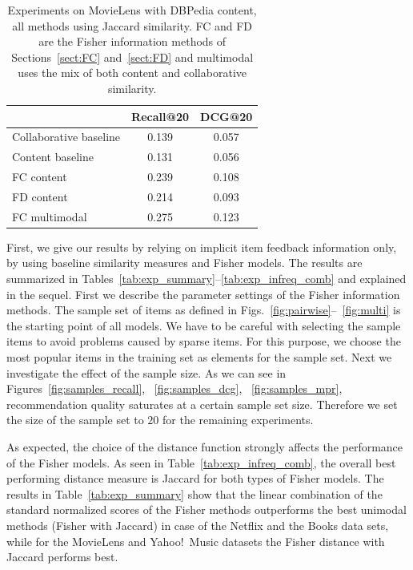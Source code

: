\begin{table} 
\caption[]{Experiments on MovieLens with DBPedia content, all methods using Jaccard similarity.  FC and FD are the Fisher information methods of Sections~\ref{sect:FC} and~\ref{sect:FD} and multimodal uses the mix of both content and collaborative similarity.}
\centering
    \begin{tabular}{lcc}
			& Recall@20 	& DCG@20 \\ \hline
Collaborative baseline	& 0.139		& 0.057 \\
Content baseline      	& 0.131 	& 0.056 \\
FC content 		& 0.239 	& 0.108 \\
FD content		& 0.214 	& 0.093 \\
FC multimodal    	& 0.275 	& 0.123 \\ \hline 
    \end{tabular}
      \label{tab:exp_content}
\end{table}

First, we give our results by relying on implicit item feedback information only, by using baseline similarity measures and Fisher models.  The results are summarized in Tables~\ref{tab:exp_summary}--\ref{tab:exp_infreq_comb} and explained in the sequel.
First we describe the parameter settings of the Fisher information methods.
The sample set of items as defined in Figs.~\ref{fig:pairwise}--~\ref{fig:multi} is the starting point of all models.
We have to be careful with selecting the sample items to avoid problems caused by sparse items.  For this purpose, we choose the most popular items in the training set as elements for the sample set.
Next  we investigate the effect of the sample size.
As we can see in Figures~\ref{fig:samples_recall}, ~\ref{fig:samples_dcg}, ~\ref{fig:samples_mpr}, recommendation quality saturates at a certain sample set size. Therefore we set the size of the sample set to $20$ for the remaining experiments. 

As expected, the choice of the distance function strongly affects the performance of the Fisher models. As seen in Table~\ref{tab:exp_infreq_comb}, the overall best performing distance measure is Jaccard for both types of Fisher models. 
The results in Table~\ref{tab:exp_summary} show that the linear combination of the standard normalized scores of the Fisher methods outperforms the best unimodal methods (Fisher with Jaccard) in 
case of the Netflix and the Books data sets, while for the MovieLens and Yahoo!\ Music datasets the Fisher distance with Jaccard performs best. 

